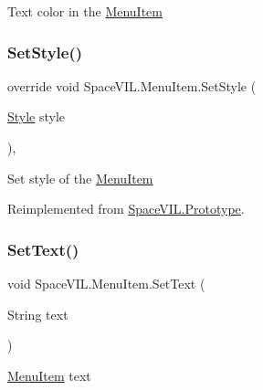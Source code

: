 Text color in the \mbox{\hyperlink{class_space_v_i_l_1_1_menu_item}{Menu\+Item}} 

\mbox{\label{class_space_v_i_l_1_1_menu_item_a836d866b3d92b8217a49ddd19b0a35f5}} 
\subsubsection{\texorpdfstring{Set\+Style()}{SetStyle()}}
{\footnotesize\ttfamily override void Space\+V\+I\+L.\+Menu\+Item.\+Set\+Style (\begin{DoxyParamCaption}\item[{\mbox{\hyperlink{class_space_v_i_l_1_1_decorations_1_1_style}{Style}}}]{style }\end{DoxyParamCaption})\hspace{0.3cm}{\ttfamily [inline]}, {\ttfamily [virtual]}}



Set style of the \mbox{\hyperlink{class_space_v_i_l_1_1_menu_item}{Menu\+Item}} 



Reimplemented from \mbox{\hyperlink{class_space_v_i_l_1_1_prototype_ae96644a6ace490afb376fb542161e541}{Space\+V\+I\+L.\+Prototype}}.

\mbox{\label{class_space_v_i_l_1_1_menu_item_aaf17e0e26cc6532de675cc6d2fdafc1e}} 
\subsubsection{\texorpdfstring{Set\+Text()}{SetText()}}
{\footnotesize\ttfamily void Space\+V\+I\+L.\+Menu\+Item.\+Set\+Text (\begin{DoxyParamCaption}\item[{String}]{text }\end{DoxyParamCaption})\hspace{0.3cm}{\ttfamily [inline]}}



\mbox{\hyperlink{class_space_v_i_l_1_1_menu_item}{Menu\+Item}} text 

